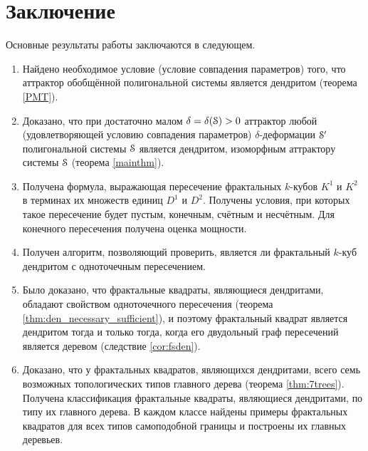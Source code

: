 \chapter*{Заключение}                       %


Основные результаты работы заключаются в следующем.

\begin{enumerate}
\item Найдено необходимое условие (условие совпадения параметров) того, что аттрактор обобщённой полигональной системы является дендритом (теорема \ref{PMT}). 

\item Доказано, что при достаточно малом $\delta=\delta({\EuScript S})>0$ аттрактор любой (удовлетворяющей условию совпадения параметров) $\delta$-деформации ${\EuScript S}'$  полигональной системы ${\EuScript S}$ является дендритом, изоморфным аттрактору системы ${\EuScript S}$ (теорема \ref{mainthm}).

\item Получена формула, выражающая пересечение фрактальных $k$-кубов $K^1$ и $K^2$ в терминах их множеств единиц $D^1$ и $D^2$.
Получены условия, при которых такое пересечение будет пустым, конечным, счётным и несчётным.
Для конечного пересечения получена оценка мощности.

\item Получен алгоритм, позволяющий проверить, является ли фрактальный $k$-куб дендритом с одноточечным пересечением.

\item Было доказано, что фрактальные квадраты, являющиеся дендритами, обладают свойством одноточечного пересечения (теорема \ref{thm:den_necessary_sufficient}), и поэтому фрактальный квадрат является дендритом тогда и только тогда, когда его двудольный граф пересечений является деревом (следствие \ref{cor:fsden}).

\item Доказано, что у фрактальных квадратов, являющихся дендритами, всего семь возможных топологических типов главного дерева (теорема \ref{thm:7trees}).
Получена классификация фрактальные квадраты, являющиеся дендритами, по типу их главного дерева.
В каждом классе найдены примеры фрактальных квадратов для всех типов самоподобной границы и построены их главных деревьев.
\end{enumerate}

